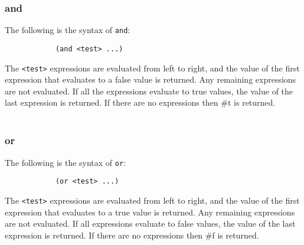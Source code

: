\documentclass{article}
\begin{document}
\subsubsection*{and}
The following is the syntax of \texttt{and}:
\begin{lstlisting}
            (and <test> ...)
\end{lstlisting}
The \texttt{<test>} expressions are evaluated from left to right, and the value of the first expression that evaluates to a false value is returned. Any remaining expressions are not evaluated. If all the expressions evaluate to true values, the value of the last expression is returned. If there are no expressions then \#t is returned.\\ \\

\subsubsection*{or}
The following is the syntax of \texttt{or}:
\begin{lstlisting}
            (or <test> ...)
\end{lstlisting}
The \texttt{<test>} expressions are evaluated from left to right, and the value of the first expression that evaluates to a true value is returned. Any remaining expressions are not evaluated. If all expressions evaluate to false values, the value of the last expression is returned. If there are no expressions then \#f is returned.
\end{document}
